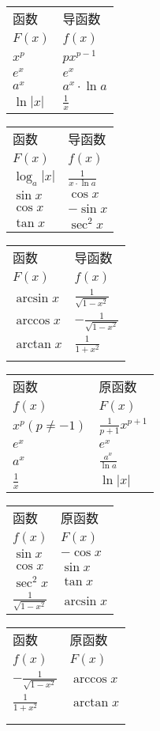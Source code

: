 \documentclass[a4paper,punct=CCT]{ctexbook}
\theoremstyle{break}
\begin{document}
\begin{table*}[h]
  \caption*{导数表}
  \centering
  \begin{tabular}{ l l }
    函数		&	导函数 \\
    $F(x)$		&	$f(x)$ \\
    $x^p$		&	$px^{p-1}$ \\
    $e^x$		&	$e^x$ \\
    $a^x$		&	$a^x \cdot \ln a$ \\
    $\ln |x|$	&	$\frac{1}{x}$
  \end{tabular}
  \begin{tabular}{ l l }
    函数			&	导函数 \\
    $F(x)$			&	$f(x)$ \\
    $\log_a |x|$	&	$\frac{1}{x \cdot \ln a}$ \\
    $\sin x$		&	$\cos x$ \\
    $\cos x$		&	$-\sin x$ \\
    $\tan x$		&	$\sec^2 x$
  \end{tabular}
  \begin{tabular}{ l l }
    函数		&	导函数 \\
    $F(x)$		&	$f(x)$ \\
    $\arcsin x$	&	$\frac{1}{\sqrt{1-x^2}}$ \\
    $\arccos x$&	$-\frac{1}{\sqrt{1-x^2}}$ \\
    $\arctan x$&	$\frac{1}{1+x^2}$ \\ {}
  \end{tabular}
\end{table*}

\begin{table*}[h]
  \caption*{原函数表}
  \centering
  \begin{tabular}{ l l }
    函数			&	原函数 \\
    $f(x)$			&	$F(x)$ \\
    $x^p(p\ne-1)$	&	$\frac{1}{p+1} x^{p+1}$ \\
    $e^x$			&	$e^x$ \\
    $a^x$			&	$\frac{a^x}{\ln a}$ \\
    $\frac{1}{x}$	&	$\ln |x|$
  \end{tabular}
  \begin{tabular}{ l l }
    函数						&	原函数 \\
    $f(x)$						&	$F(x)$ \\
    $\sin x$					&	$-\cos x$ \\
    $\cos x$					&	$\sin x$ \\
    $\sec^2 x$					&	$\tan x$ \\
    $\frac{1}{\sqrt{1-x^2}}$	&	$\arcsin x$
  \end{tabular}
  \begin{tabular}{ l l }
    函数						&	原函数 \\
    $f(x)$						&	$F(x)$ \\
    $-\frac{1}{\sqrt{1-x^2}}$	&	$\arccos x$ \\
    $\frac{1}{1+x^2}$			&	$\arctan x$ \\ \\ {}
  \end{tabular}
\end{table*}
\end{document}
